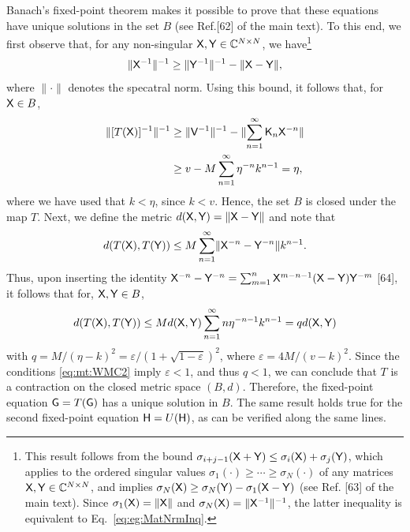 \documentclass[aps,prl,reprint]{revtex4-2}
\begin{document}
Banach's fixed-point theorem makes it possible to prove that these equations have unique solutions in the set $B$ (see Ref.[62] of the main text).
To this end, we first observe that,  for any non-singular $\mathsf{X},\mathsf{Y}\in\mathbb{C}^{N\times N}$, we have\footnote{This result follows from the bound $\sigma_{i+j-1}(\mathsf{X} + \mathsf{Y}) \leq \sigma_i(\mathsf{X}) + \sigma_j(\mathsf{Y})$, which applies to the ordered singular values $\sigma_1 (\cdot) \geq \cdots \geq \sigma_N(\cdot)$ of any matrices $\mathsf{X},\mathsf{Y}\in\mathbb{C}^{N\times N}$, and implies $\sigma_N(\mathsf{X}) \geq \sigma_N(\mathsf{Y}) - \sigma_1(\mathsf{X}- \mathsf{Y})$ (see Ref. [63] of the main text). Since $\sigma_1(\mathsf{X}) = \lVert \mathsf{X} \rVert$ and $\sigma_N(\mathsf{X}) = \lVert \mathsf{X}^{-1} \rVert^{-1}$, the latter inequality is equivalent to Eq.~\eqref{eq:eg:MatNrmInq}.}
\begin{equation}\label{eq:eg:MatNrmInq}
\lVert \mathsf{X}^{-1} \rVert^{-1}\geq \lVert \mathsf{Y}^{-1} \rVert^{-1} - \lVert \mathsf{X}-\mathsf{Y} \rVert,
\end{equation}
where $\lVert \cdot \rVert$ denotes the specatral norm.
Using this bound, it follows that, for $\mathsf{X}\in B$,
\begin{align}
\lVert [T(\mathsf{X})]^{-1} \rVert^{-1} & \geq \lVert \mathsf{V}^{-1} \rVert^{-1} - \lVert \sum_{n=1}^\infty\mathsf{K}_n\mathsf{X}^{-n} \rVert\\
& \geq v - M\sum_{n=1}^\infty \eta^{-n} k^{n-1} = \eta,\nonumber
\end{align}
where we have used that $k<\eta$, since $k<v$.
Hence, the set $B$ is closed under the map $T$.
Next, we define the metric $d(\mathsf{X},\mathsf{Y}) = \lVert \mathsf{X}-\mathsf{Y} \rVert$ and note that
\begin{equation}
d(T(\mathsf{X}),T(\mathsf{Y}))\leq M\sum_{n=1}^\infty \lVert \mathsf{X}^{-n}-\mathsf{Y}^{-n} \rVert k^{n-1}.
\end{equation}
Thus, upon inserting the identity $\mathsf{X}^{-n}-\mathsf{Y}^{-n} = \sum_{m=1}^n \mathsf{X}^{m-n-1}(\mathsf{X}-\mathsf{Y})\mathsf{Y}^{-m}$ [64], it follows that for, $\mathsf{X},\mathsf{Y}\in B$,
\begin{equation}
d(T(\mathsf{X}),T(\mathsf{Y})) \leq M d(\mathsf{X},\mathsf{Y}) \sum_{n=1}^\infty n \eta^{-n-1}k^{n-1} = qd(\mathsf{X},\mathsf{Y})
\end{equation}
with $q = M/(\eta-k)^ 2 = \varepsilon/(1+\sqrt{1-\varepsilon})^2$, where $\varepsilon=4M/(v-k)^ 2$.
Since the conditions \eqref{eq:mt:WMC2} imply $\varepsilon<1$, and thus $q<1$, we can conclude that $T$ is a contraction on the closed metric space $(B,d)$.
Therefore, the fixed-point equation $\mathsf{G} = T(\mathsf{G})$ has a unique solution in $B$.
The same result holds true for the second fixed-point equation $\mathsf{H} = U(\mathsf{H})$, as can be verified along the same lines.
\end{document}

